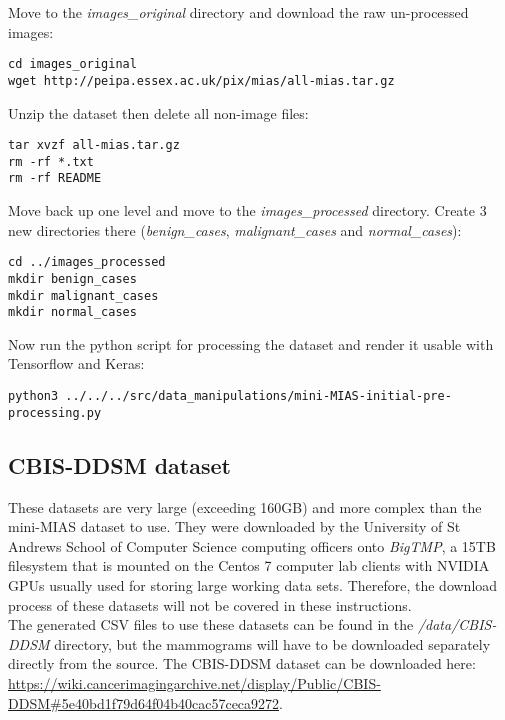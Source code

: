 Move to the \textit{images\_original} directory and download the raw un-processed images:

\begin{lstlisting}
cd images_original
wget http://peipa.essex.ac.uk/pix/mias/all-mias.tar.gz
\end{lstlisting}

Unzip the dataset then delete all non-image files:

\begin{lstlisting}
tar xvzf all-mias.tar.gz
rm -rf *.txt 
rm -rf README 
\end{lstlisting}

Move back up one level and move to the \textit{images\_processed} directory. Create 3 new directories there (\textit{benign\_cases}, \textit{malignant\_cases} and \textit{normal\_cases}):

\begin{lstlisting}
cd ../images_processed
mkdir benign_cases
mkdir malignant_cases
mkdir normal_cases
\end{lstlisting}

Now run the python script for processing the dataset and render it usable with Tensorflow and Keras:

\begin{lstlisting}
python3 ../../../src/data_manipulations/mini-MIAS-initial-pre-processing.py
\end{lstlisting}

\subsection{CBIS-DDSM dataset}

These datasets are very large (exceeding 160GB) and more complex than the mini-MIAS dataset to use. They were downloaded by the University of St Andrews School of Computer Science computing officers onto \textit{BigTMP}, a 15TB filesystem that is mounted on the Centos 7 computer lab clients with NVIDIA GPUs usually used for storing large working data sets. Therefore, the download process of these datasets will not be covered in these instructions.\\

The generated CSV files to use these datasets can be found in the \textit{/data/CBIS-DDSM} directory, but the mammograms will have to be downloaded separately directly from the source. The CBIS-DDSM dataset can be downloaded here: \url{https://wiki.cancerimagingarchive.net/display/Public/CBIS-DDSM#5e40bd1f79d64f04b40cac57ceca9272}.
